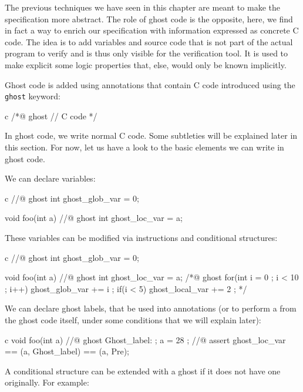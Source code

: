 
The previous techniques we have seen in this chapter are meant to make the
specification more abstract. The role of ghost code is the opposite, here, we
find in fact a way to enrich our specification with information expressed as
concrete C code. The idea is to add variables and source code that is not part
of the actual program to verify and is thus only visible for the verification
tool. It is used to make explicit some logic properties that, else, would only
be known implicitly.




Ghost code is added using annotations that contain C code
introduced using the \texttt{ghost} keyword:


\begin{CodeBlock}{c}
/*@
  ghost
  // C code
*/
\end{CodeBlock}


In ghost code, we write normal C code. Some subtleties will be explained
later in this section. For now, let us have a look to the basic elements
we can write in ghost code.


We can declare variables:


\begin{CodeBlock}{c}
//@ ghost int ghost_glob_var = 0;

void foo(int a){
  //@ ghost int ghost_loc_var = a;
}
\end{CodeBlock}


These variables can be modified via instructions and conditional structures:


\begin{CodeBlock}{c}
//@ ghost int ghost_glob_var = 0;

void foo(int a){
  //@ ghost int ghost_loc_var = a;
  /*@ ghost
    for(int i = 0 ; i < 10 ; i++){
      ghost_glob_var += i ;
      if(i < 5) ghost_local_var += 2 ;
    }
  */
}
\end{CodeBlock}


We can declare ghost labels, that be used into annotations (or to perform
a  from the ghost code itself, under some conditions that
we will explain later):


\begin{CodeBlock}{c}
void foo(int a){
  //@ ghost Ghost_label: ;
  a = 28 ;
  //@ assert ghost_loc_var == \at(a, Ghost_label) == \at(a, Pre);
}
\end{CodeBlock}


A conditional structure  can be extended with a ghost
 if it does not have one originally. For example:


